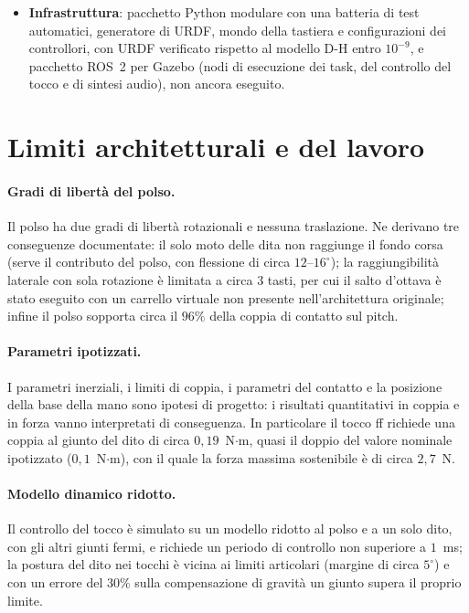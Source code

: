 \begin{itemize}
    \item \textbf{Infrastruttura}: pacchetto Python modulare con una batteria di test automatici, generatore di URDF, mondo della tastiera e configurazioni dei controllori, con URDF verificato rispetto al modello D-H entro $10^{-9}$, e pacchetto ROS~2 per Gazebo (nodi di esecuzione dei task, del controllo del tocco e di sintesi audio), non ancora eseguito.
\end{itemize}

\section{Limiti architetturali e del lavoro}

\paragraph{Gradi di libertà del polso.} Il polso ha due gradi di libertà rotazionali e nessuna traslazione. Ne derivano tre conseguenze documentate: il solo moto delle dita non raggiunge il fondo corsa (serve il contributo del polso, con flessione di circa $12$--$16^\circ$); la raggiungibilità laterale con sola rotazione è limitata a circa $3$ tasti, per cui il salto d'ottava è stato eseguito con un carrello virtuale non presente nell'architettura originale; infine il polso sopporta circa il $96\%$ della coppia di contatto sul pitch.

\paragraph{Parametri ipotizzati.} I parametri inerziali, i limiti di coppia, i parametri del contatto e la posizione della base della mano sono ipotesi di progetto: i risultati quantitativi in coppia e in forza vanno interpretati di conseguenza. In particolare il tocco ff richiede una coppia al giunto del dito di circa $0{,}19$~N$\cdot$m, quasi il doppio del valore nominale ipotizzato ($0{,}1$~N$\cdot$m), con il quale la forza massima sostenibile è di circa $2{,}7$~N.

\paragraph{Modello dinamico ridotto.} Il controllo del tocco è simulato su un modello ridotto al polso e a un solo dito, con gli altri giunti fermi, e richiede un periodo di controllo non superiore a $1$~ms; la postura del dito nei tocchi è vicina ai limiti articolari (margine di circa $5^\circ$) e con un errore del $30\%$ sulla compensazione di gravità un giunto supera il proprio limite.

